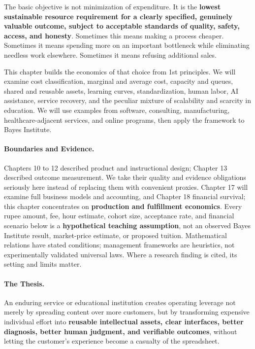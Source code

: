 The basic objective is not minimization of expenditure. It is the \textbf{lowest sustainable resource requirement for a clearly specified, genuinely valuable outcome, subject to acceptable standards of quality, safety, access, and honesty}. Sometimes this means making a process cheaper. Sometimes it means spending more on an important bottleneck while eliminating needless work elsewhere. Sometimes it means refusing additional sales.

This chapter builds the economics of that choice from 1st principles. We will examine cost classification, marginal and average cost, capacity and queues, shared and reusable assets, learning curves, standardization, human labor, AI assistance, service recovery, and the peculiar mixture of scalability and scarcity in education. We will use examples from software, consulting, manufacturing, healthcare-adjacent services, and online programs, then apply the framework to Bayes Institute.

\paragraph*{Boundaries and Evidence.} Chapters 10 to 12 described product and instructional design; Chapter 13 described outcome measurement. We take their quality and evidence obligations seriously here instead of replacing them with convenient proxies. Chapter 17 will examine full business models and accounting, and Chapter 18 financial survival; this chapter concentrates on \textbf{production and fulfillment economics}. Every rupee amount, fee, hour estimate, cohort size, acceptance rate, and financial scenario below is a \textbf{hypothetical teaching assumption}, not an observed Bayes Institute result, market-price estimate, or proposed tuition. Mathematical relations have stated conditions; management frameworks are heuristics, not experimentally validated universal laws. Where a research finding is cited, its setting and limits matter.

\paragraph*{The Thesis.} An enduring service or educational institution creates operating leverage not merely by spreading content over more customers, but by transforming expensive individual effort into \textbf{reusable intellectual assets, clear interfaces, better diagnosis, better human judgment, and verifiable outcomes}, without letting the customer's experience become a casualty of the spreadsheet.


